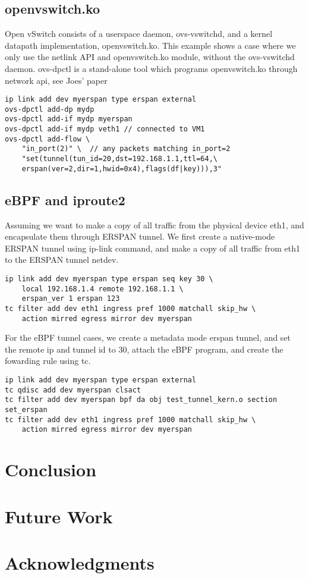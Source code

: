 \documentclass{sigplanconf}
\begin{document}
\subsection{openvswitch.ko}\label{ovs}
Open vSwitch consists of a userspace daemon, ovs-vswitchd, and a kernel
datapath implementation, openvswitch.ko.
This example shows a case where we only use the netlink API and openvswitch.ko
module, without the ovs-vswitchd daemon.
ovs-dpctl is a stand-alone tool which programs openvswitch.ko
through network api, see Joes' paper
\begin{verbatim}
ip link add dev myerspan type erspan external
ovs-dpctl add-dp mydp
ovs-dpctl add-if mydp myerspan
ovs-dpctl add-if mydp veth1 // connected to VM1
ovs-dpctl add-flow \
    "in_port(2)" \  // any packets matching in_port=2
    "set(tunnel(tun_id=20,dst=192.168.1.1,ttl=64,\
    erspan(ver=2,dir=1,hwid=0x4),flags(df|key))),3"
\end{verbatim}

\subsection{eBPF and iproute2}\label{iproute2}

Assuming we want to make a copy of all traffic from the physical
device eth1, and encapsulate them through ERSPAN tunnel.
We first create a native-mode ERSPAN tunnel using ip-link command,
and make a copy of all traffic from eth1 to the ERSPAN tunnel netdev.
\begin{verbatim}
ip link add dev myerspan type erspan seq key 30 \
    local 192.168.1.4 remote 192.168.1.1 \
    erspan_ver 1 erspan 123
tc filter add dev eth1 ingress pref 1000 matchall skip_hw \
    action mirred egress mirror dev myerspan
\end{verbatim}

For the eBPF tunnel cases,
we create a metadata mode erspan tunnel, and set the
remote ip and tunnel id to 30, attach the eBPF program,
and create the fowarding rule using tc.
\begin{verbatim}
ip link add dev myerspan type erspan external
tc qdisc add dev myerspan clsact
tc filter add dev myerspan bpf da obj test_tunnel_kern.o section set_erspan
tc filter add dev eth1 ingress pref 1000 matchall skip_hw \
    action mirred egress mirror dev myerspan
\end{verbatim}


\section{Conclusion}
\section{Future Work}
\section{Acknowledgments}



\end{document}
